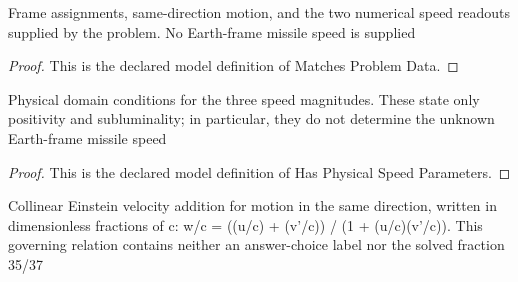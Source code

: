 \begin{definition}
  \label{def:physics:phyx-mini-0553:phyxminiproblems-problemphyxmini0553-matchesproblemdata}
  Frame assignments, same-direction motion, and the two numerical speed readouts supplied by the problem. No Earth-frame missile speed is supplied
\end{definition}
\begin{proof}
  This is the declared model definition of Matches Problem Data.
\end{proof}
\begin{definition}
  \label{def:physics:phyx-mini-0553:phyxminiproblems-problemphyxmini0553-hasphysicalspeedparameters}
  Physical domain conditions for the three speed magnitudes. These state only positivity and subluminality; in particular, they do not determine the unknown Earth-frame missile speed
\end{definition}
\begin{proof}
  This is the declared model definition of Has Physical Speed Parameters.
\end{proof}
\begin{definition}
  \label{def:physics:phyx-mini-0553:phyxminiproblems-problemphyxmini0553-satisfiescollineareinsteinvelocityaddition}
  Collinear Einstein velocity addition for motion in the same direction, written in dimensionless fractions of c: w/c = ((u/c) + (v'/c)) / (1 + (u/c)(v'/c)). This governing relation contains neither an answer-choice label nor the solved fraction 35/37
\end{definition}
